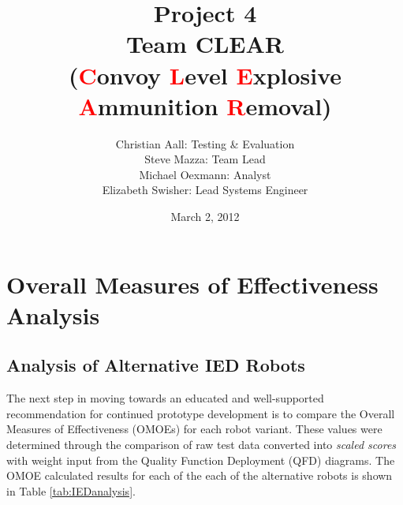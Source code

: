 \documentclass[letterpaper,10pt]{article}
\title{Project 4 \\ \Large Team CLEAR \\ \normalsize (\textcolor{red}{C}onvoy \textcolor{red}{L}evel \textcolor{red}{E}xplosive \textcolor{red}{A}mmunition \textcolor{red}{R}emoval)}
\author{Christian Aall: Testing \& Evaluation \\ 
	Steve Mazza: Team Lead \\ 
	Michael Oexmann: Analyst \\ 
	Elizabeth Swisher: Lead Systems Engineer}
\date{March 2, 2012}
\begin{document}
\maketitle
\tableofcontents
\listoftables
\listoffigures

\pagebreak

\section{Overall Measures of Effectiveness Analysis}
\subsection{Analysis of Alternative IED Robots}
The next step in moving towards an educated and well-supported recommendation for continued prototype development is to compare the Overall Measures of Effectiveness (OMOEs) for each robot variant. These values were determined through the comparison of raw test data converted into \emph{scaled scores} with weight input from the Quality Function Deployment (QFD) diagrams. The OMOE calculated results for each of the each of the alternative robots is shown in Table \ref{tab:IEDanalysis}.
\end{document}
